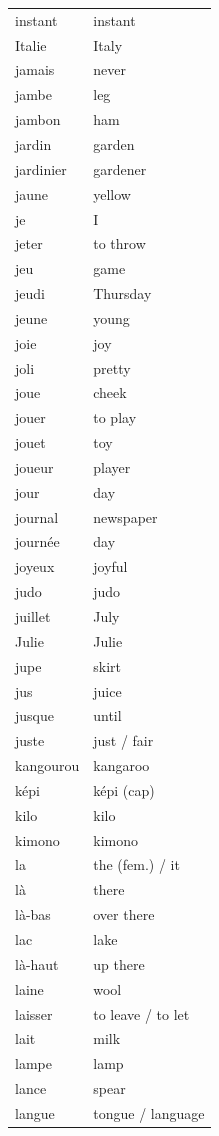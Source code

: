 \documentclass[12pt,a4paper]{article}
\begin{document}
\begin{longtable}{p{4cm} p{6cm}}
instant & instant \\
Italie & Italy \\
jamais & never \\
jambe & leg \\
jambon & ham \\
jardin & garden \\
jardinier & gardener \\
jaune & yellow \\
je & I \\
jeter & to throw \\
jeu & game \\
jeudi & Thursday \\
jeune & young \\
joie & joy \\
joli & pretty \\
joue & cheek \\
jouer & to play \\
jouet & toy \\
joueur & player \\
jour & day \\
journal & newspaper \\
journée & day \\
joyeux & joyful \\
judo & judo \\
juillet & July \\
Julie & Julie \\
jupe & skirt \\
jus & juice \\
jusque & until \\
juste & just / fair \\
kangourou & kangaroo \\
képi & képi (cap) \\
kilo & kilo \\
kimono & kimono \\
la & the (fem.) / it \\
là & there \\
là-bas & over there \\
lac & lake \\
là-haut & up there \\
laine & wool \\
laisser & to leave / to let \\
lait & milk \\
lampe & lamp \\
lance & spear \\
langue & tongue / language \\

\end{longtable}
\end{document}
